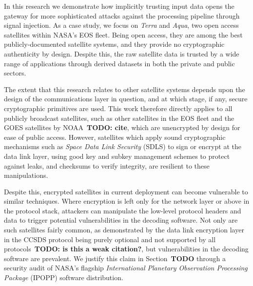 In this research we demonstrate how implicitly trusting input data opens the gateway for more sophisticated attacks against the processing pipeline through signal injection.
As a case study, we focus on \textit{Terra} and \textit{Aqua}, two open access satellites within NASA's EOS fleet.
Being open access, they are among the best publicly-documented satellite systems, and they provide no cryptographic authenticity by design.
Despite this, the raw satellite data is trusted by a wide range of applications through derived datasets in both the private and public sectors.

The extent that this research relates to other satellite systems depends upon the design of the communications layer in question, and at which stage, if any, secure cryptographic primitives are used.
This work therefore directly applies to all publicly broadcast satellites, such as other satellites in the EOS fleet and the GOES satellites by NOAA~\textbf{TODO: cite}, which are unencrypted by design for ease of public access. %
However, satellites which apply sound cryptographic mechanisms such as \textit{Space Data Link Security} (SDLS) to sign or encrypt at the data link layer, using good key and subkey management schemes to protect against leaks, and checksums to verify integrity, are resilient to these manipulations.



Despite this, encrypted satellites in current deployment can become vulnerable to similar techniques.
Where encryption is left only for the network layer or above in the protocol stack, attackers can manipulate the low-level protocol headers and data to trigger potential vulnerabilities in the decoding software.
Not only are such satellites fairly common, as demonstrated by the data link encryption layer in the CCSDS protocol being purely optional and not supported by all protocols~\cite{ccsdsOverview}\textbf{TODO: is this a weak citation?}, but vulnerabilities in the decoding software are prevalent.
We justify this claim in Section~\textbf{TODO} through a security audit of NASA's flagship \textit{International Planetary Observation Processing Package} (IPOPP) software distribution.

